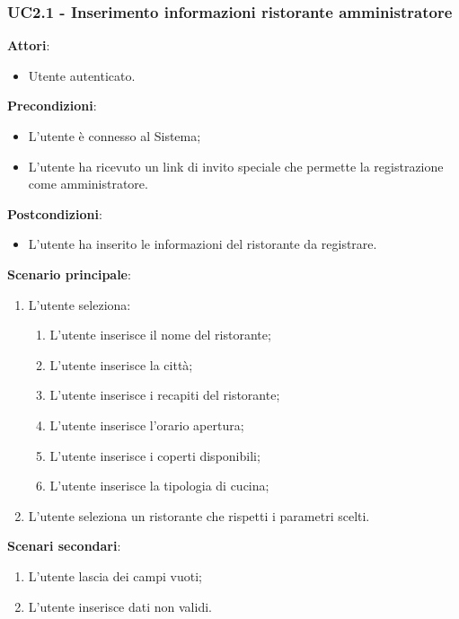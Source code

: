 \subsubsection{UC2.1 - Inserimento informazioni ristorante amministratore}\label{usecase:2_1}
\textbf{Attori}:
\begin{itemize}
    \item Utente autenticato.
\end{itemize}
\textbf{Precondizioni}:
\begin{itemize}
    \item L'utente è connesso al Sistema;
    \item L'utente ha ricevuto un link di invito speciale che permette la registrazione come amministratore.
\end{itemize}
\textbf{Postcondizioni}:
\begin{itemize}
    \item L'utente ha inserito le informazioni del ristorante da registrare.
\end{itemize}
\textbf{Scenario principale}:
\begin{enumerate}
    \item L'utente seleziona:
    \begin{enumerate}
        \item L'utente inserisce il nome del ristorante;
        \item L'utente inserisce la città;
        \item L'utente inserisce i recapiti del ristorante;
        \item L'utente inserisce l'orario apertura;
        \item L'utente inserisce i coperti disponibili;
        \item L'utente inserisce la tipologia di cucina;
    \end{enumerate}
    \item L'utente seleziona un ristorante che rispetti i parametri scelti.
\end{enumerate}
\textbf{Scenari secondari}:
    \begin{enumerate}
        \item L'utente lascia dei campi vuoti;
        \item L'utente inserisce dati non validi.
    \end{enumerate}
\newpage